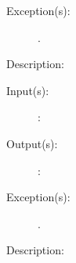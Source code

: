 \begin{description}
\begin{description}
	\item[Exception(s): ]
		\begin{description}\item[]
		\item[.]
		\end{description}
	\item[Description: ]
	\end{description}
\label{thd_}
\item[{\cfunc[]{thd\_}{}}: ]
	\begin{description}\item[]
	\item[Input(s): ]
		\begin{description}\item[]
		\item[: ]
		\end{description}
	\item[Output(s): ]
		\begin{description}\item[]
		\item[: ]
		\end{description}
	\item[Exception(s): ]
		\begin{description}\item[]
		\item[.]
		\end{description}
	\item[Description: ]
	\end{description}
\end{description}
